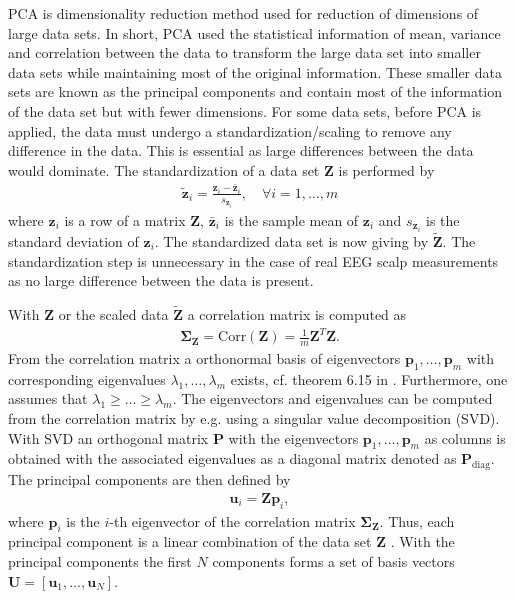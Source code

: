 PCA is dimensionality reduction method used for reduction of dimensions of large data sets. 
In short, PCA used the statistical information of mean, variance and correlation between the data to transform the large data set into smaller data sets while maintaining most of the original information. 
These smaller data sets are known as the principal components and contain most of the information of the data set but with fewer dimensions. 
For some data sets, before PCA is applied, the data must undergo a standardization/scaling to remove any difference in the data. 
This is essential as large differences between the data would dominate. The standardization of a data set $\mathbf{Z}$ is performed by
\begin{align*}
\tilde{\mathbf{z}}_i = \frac{\mathbf{z}_i - \bar{\mathbf{z}}_i}{s_{\mathbf{z}_i}}, \quad \forall i = 1, \dots, m
\end{align*}
where $\mathbf{z}_i$ is a row of a matrix $\mathbf{Z}$, $\bar{\mathbf{z}}_i$ is the sample mean of $\mathbf{z}_i$ and $s_{\mathbf{z}_i}$ is the standard deviation of $\mathbf{z}_i$. 
The standardized data set is now giving by $\tilde{\mathbf{Z}}$. 
The standardization step is unnecessary in the case of real EEG scalp measurements as no large difference between the data is present.

With $\mathbf{Z}$ or the scaled data $\tilde{\mathbf{Z}}$ a correlation matrix is computed as
\begin{align*}
\boldsymbol{\Sigma}_{\mathbf{Z}} = \text{Corr}(\mathbf{Z}) = \frac{1}{m} \mathbf{Z}^T \mathbf{Z}.
\end{align*}
From the correlation matrix a orthonormal basis of eigenvectors $\mathbf{p}_1, \dots, \mathbf{p}_m$ with corresponding eigenvalues $\lambda_1, \dots, \lambda_m$ exists, cf. theorem 6.15 in \cite[p. 375]{PCA}. 
Furthermore, one assumes that $\lambda_1 \geq \dots \geq \lambda_m$. 
The eigenvectors and eigenvalues can be computed from the correlation matrix by e.g. using a singular value decomposition (SVD). 
With SVD an orthogonal matrix $\mathbf{P}$ with the eigenvectors $\mathbf{p}_1, \dots, \mathbf{p}_m$ as columns is obtained with the associated eigenvalues as a diagonal matrix denoted as $\mathbf{P}_{\text{diag}}$.
The principal components are then defined by
\begin{align*}
\mathbf{u}_i = \mathbf{Z} \mathbf{p}_i,
\end{align*}
where $\mathbf{p}_i$ is the $i$-th eigenvector of the correlation matrix $\boldsymbol{\Sigma}_{\mathbf{Z}}$. 
Thus, each principal component is a linear combination of the data set $\mathbf{Z}$ \cite[p. 460] {PCA}. 
With the principal components the first $N$ components forms a set of basis vectors $\mathbf{U} = [\mathbf{u}_1, \dots, \mathbf{u}_N]$.

